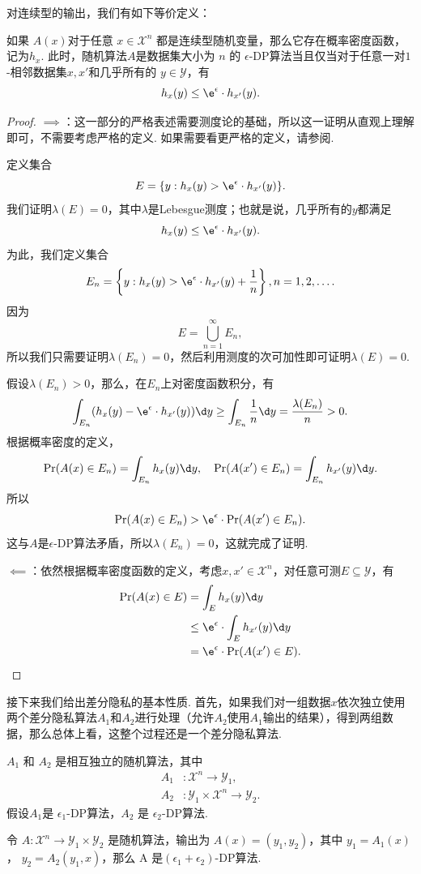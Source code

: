 对连续型的输出，我们有如下等价定义：
\begin{proposition}\label{prop:continuous-dp}
如果 $A(x)$对于任意 $x \in \mathcal X^n$ 都是连续型随机变量，那么它存在概率密度函数，记为$h_{x}$. 此时，随机算法$A$是数据集大小为 $n$ 的 $\epsilon$-DP算法当且仅当对于任意一对$1$-相邻数据集$x, x'$和几乎所有的 $y \in \mathcal Y$，有
    \[
    h_{x}(y) \leq \e^{\epsilon} \cdot h_{x'}(y).
    \]
\end{proposition}
\begin{proof}
$\implies$：这一部分的严格表述需要测度论的基础，所以这一证明从直观上理解即可，不需要考虑严格的定义. 如果需要看更严格的定义，请参阅.

定义集合
\[E=\{y:h_x(y)>\e^\epsilon\cdot h_{x'}(y)\}.\]
我们证明$\lambda(E)=0$，其中$\lambda$是Lebesgue测度；也就是说，几乎所有的$y$都满足
\[h_x(y)\leq\e^\epsilon\cdot h_{x'}(y).\]
为此，我们定义集合
\[E_n=\left\{y:h_x(y)>\e^\epsilon\cdot h_{x'}(y)+\frac{1}{n}\right\}, n=1,2,\dots.\]
因为
\[E=\bigcup_{n=1}^\infty E_n,\]
所以我们只需要证明$\lambda(E_n)=0$，然后利用测度的次可加性即可证明$\lambda(E)=0$.

假设$\lambda(E_n)>0$，那么，在$E_n$上对密度函数积分，有
\[\int_{E_n}(h_x(y)-\e^\epsilon\cdot h_{x'}(y))\d y\geq \int_{E_n}\frac{1}{n}\d y=\frac{\lambda(E_n)}{n}>0.\]
根据概率密度的定义，
\[\Pr(A(x)\in E_n)=\int_{E_n}h_x(y)\d y,\quad\Pr(A(x')\in E_n)=\int_{E_n}h_{x'}(y)\d y.\]
所以
\[\Pr(A(x)\in E_n)>\e^\epsilon\cdot\Pr(A(x')\in E_n).\]
这与$A$是$\epsilon$-DP算法矛盾，所以$\lambda(E_n)=0$，这就完成了证明.

$\impliedby$：依然根据概率密度函数的定义，考虑$x,x'\in\mathcal X^n$，对任意可测$E\subseteq\mathcal Y$，有
\begin{align*}
\Pr(A(x)\in E) &= \int_E h_x(y)\d y \\
&\leq \e^\epsilon\cdot\int_E h_{x'}(y)\d y \\
&= \e^\epsilon\cdot\Pr(A(x')\in E).
\end{align*}
\end{proof}

接下来我们给出差分隐私的基本性质. 首先，如果我们对一组数据$x$依次独立使用两个差分隐私算法$A_1$和$A_2$进行处理（允许$A_2$使用$A_1$输出的结果），得到两组数据，那么总体上看，这整个过程还是一个差分隐私算法. 

\begin{proposition}\label{prop:composition}
    $A_1$ 和 $A_2$ 是相互独立的随机算法，其中 
    \begin{align*}
        A_1&: \mathcal X^n \to \mathcal Y_1,\\
        A_2&: \mathcal Y_1 \times \mathcal X^n \to \mathcal Y_2.
    \end{align*}
    假设$A_1$是 $\epsilon_1$-DP算法，$A_2$ 是 $\epsilon_2$-DP算法.
    
    令 $A :\mathcal X^n \to \mathcal Y_1 \times \mathcal Y_2$ 是随机算法，输出为 $A(x) = (y_1, y_2)$，其中 $y_1 = A_1(x)$， $y_2 = A_2(y_1, x)$，那么 A 是$(\epsilon_1 + \epsilon_2)$-DP算法.
\end{proposition}

